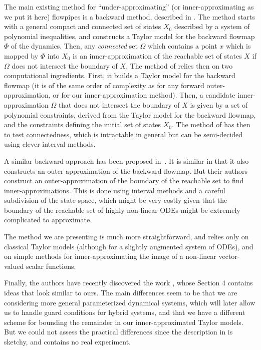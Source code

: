 \documentclass{sig-alternate-05-2015} %
\begin{document}
The main existing method for ``under-approximating'' (or inner-approximating as we put it 
here) flowpipes is a backward method, described in \cite{Underapproxflowpipes}. 
The method starts with a general
compact and connected 
set of states $X_0$ described by a system of polynomial inequalities, and constructs a Taylor
model for the backward flowmap $\Phi$ of the dynamics. Then, any {\em connected} set $\Omega$
which contains a point 
$x$ which is mapped by $\Phi$ into $X_0$ is an inner-approximation of the reachable set
of states $X$ if $\Omega$ does not intersect the boundary of 
$X$. The method of \cite{Underapproxflowpipes}
relies then on two computational ingredients. 
First, it builds a Taylor model for the backward flowmap (it is of the same order of complexity
as for any forward outer-approximation, or for our inner-approximation method). 
Then, a candidate inner-approximation $\Omega$ that does not intersect the boundary of $X$
is given by a set of polynomial constraints, derived
from the Taylor model for the backward flowmap, and the constraints defining the initial set
of states $X_0$. The method of \cite{Underapproxflowpipes} has then to test connectedness, which is intractable in general but
can be semi-decided using clever interval methods.

A similar backward approach %
has been proposed in~\cite{underapprox16}. It is similar in that it also constructs 
an outer-approximation of the backward flowmap. But their authors construct an outer-approximation
of the boundary of the reachable set to find inner-approximations. This is done using 
interval methods and a careful subdivision of the state-space, which might be very costly
given that the boundary of the reachable set of highly non-linear ODEs might be extremely 
complicated to approximate. 

The method we are presenting is much more straightforward, and relies only on classical
Taylor models (although for a slightly augmented system of ODEs), and on simple methods
for inner-approximating the image of a non-linear vector-valued scalar functions. 

Finally, the authors have recently discovered the work \cite{Gold06}, whose Section 4 contains
ideas that look similar to ours. The main differences seem to be that we are considering more
general parameterized dynamical systems, which will later allow us to handle guard conditions for hybrid systems, 
and that we have a different scheme for bounding
the remainder in our inner-approximated Taylor models. But we could not assess the practical
differences since the description in \cite{Gold06} is sketchy, and contains no real experiment. 
\end{document}
